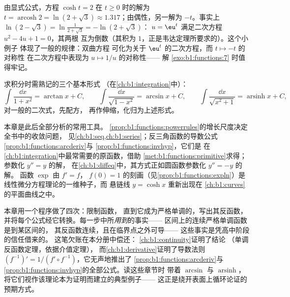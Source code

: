 \begin{example}[显式公式的应用]\label{ex:b1:functions:arcoshtwo}
由显式公式，方程 $\cosh t = 2$ 在 $t \geq 0$ 时的解为
$t = \operatorname{arcosh} 2 = \ln(2 + \sqrt3) \approx
1.317$；由偶性，另一解为 $-t$。事实上
$\ln(2 - \sqrt3) = \ln\frac1{2 + \sqrt3} = -\ln(2 + \sqrt3)$：
$u = \eu^t$ 满足二次方程 $u^2 - 4u + 1 = 0$，其两根
互为倒数（其积为 $1$，正是韦达定理所要求的）。这个小例子
体现了一般的规律：双曲方程
可化为关于 $\eu^t$ 的二次方程，而 $t \mapsto -t$ 的对称性
在二次方程中表现为 $u \mapsto 1/u$ 的对称性——
解 \cref{exo:b1:functions:7} 时值得牢记。
\end{example}

\begin{method}[选取恰当的原函数形式]\label{met:b1:functions:primitive}
求积分时需熟记的三个基本形式
（在\cref{ch:b1:integration}中）：
\[
\int \frac{\dd x}{1 + x^2} = \arctan x + C,
\qquad
\int \frac{\dd x}{\sqrt{1 - x^2}} = \arcsin x + C,
\qquad
\int \frac{\dd x}{\sqrt{x^2 + 1}} = \operatorname{arsinh} x + C,
\]
对一般的二次式，先配方，
再作伸缩，化归为上述形式。
\end{method}

\begin{remark}[本章的用途]\label{rem:b1:functions:whereused}
本章是此后全部分析的常用工具。
\cref{prop:b1:functions:powerrules}的增长尺度决定
全书中的收敛问题，
见\cref{ch:b1:seq,ch:b1:series}；反三角函数的导数公式
\cref{prop:b1:functions:arcderiv}与
\cref{prop:b1:functions:invhyp}，它们是
在\cref{ch:b1:integration}中最常需要的原函数，借助
\cref{met:b1:functions:primitive}求得；
参数化 $y'' = y$ 的解，
在\cref{ch:b1:diffeq}中，其方式正如圆函数参数化 $y'' = -y$ 的解。
函数 $\exp$ 由 $f' = f$，
$f(0) = 1$ 的刻画（见\cref{prop:b1:functions:expln}）是
线性微分方程理论的一维种子，而
悬链线 $y = \cosh x$ 重新出现在
\cref{ch:b1:curves}的平面曲线之中。
\end{remark}

\begin{remark}[插曲：反函数程序]\label{rem:b1:functions:interlude}
本章用一个程序做了四次：限制函数，
直到它成为严格单调的，写出其反函数，
并将每个公式经它转换。每一步中所\emph{用到}的事实——
区间上的连续严格单调函数是到某区间的，
其反函数连续，且在临界点之外可导——
这些事实是凭高中阶段的信任借来的。
这笔欠账在本分册中偿还：
\cref{ch:b1:continuity}证明了结论
（单调反函数定理，依据介值定理），
而\cref{ch:b1:derivative}证明了导数法则
$(f^{-1})' = 1/(f' \circ f^{-1})$，它无声地推出了
\cref{prop:b1:functions:arcderiv}与
\cref{prop:b1:functions:invhyp}的全部公式。读这些章节时
带着 $\arcsin$ 与 $\operatorname{arsinh}$，
将它们视作该理论本为证明而建立的典型例子——
这正是绕开表面上循环论证的预期方式。
\end{remark}

